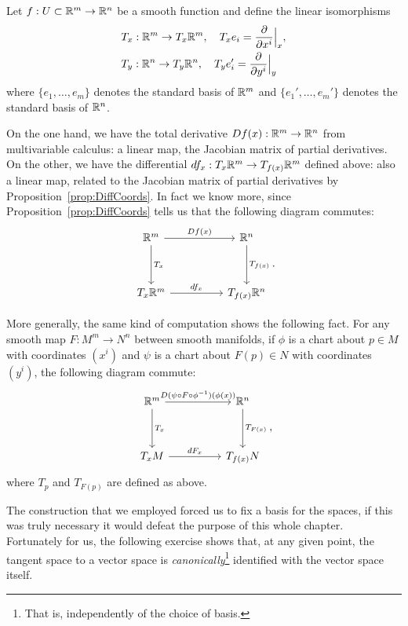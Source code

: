 Let $f:U\subset\mathbb{R}^m\to\mathbb{R}^n$ be a smooth function and define the linear isomorphisms
\begin{align}\label{def:lin_iso_Tp}
    &T_x : \mathbb{R}^m \to T_x\mathbb{R}^m,\quad T_x e_i = \frac{\partial}{\partial x^i}\Big|_x,\\
    &T_y : \mathbb{R}^n \to T_y\mathbb{R}^n,\quad T_y e_i' = \frac{\partial}{\partial y^i}\Big|_y
\end{align}
where $\{e_1,\ldots,e_m\}$ denotes the standard basis of $\mathbb{R}^m$ and $\{e_1',\ldots,e_m'\}$ denotes the standard basis of $\mathbb{R}^n$.

On the one hand, we have the total derivative $Df(x):\mathbb{R}^m\to\mathbb{R}^n$ from multivariable calculus: a linear map, the Jacobian matrix of partial derivatives.
On the other, we have the differential $df_x : T_x \mathbb{R}^m \to T_{f(x)}\mathbb{R}^m$ defined above: also a linear map, related to the Jacobian matrix of partial derivatives by Proposition~\ref{prop:DiffCoords}.
In fact we know more, since Proposition~\ref{prop:DiffCoords} tells us that the following diagram commutes:
\begin{equation}
    \begin{tikzcd}[row sep=huge, column sep=huge]
        \R^m \arrow[r, "Df(x)"] \arrow[d, "T_x"]
        & \R^n \arrow[d, "T_{f(x)}"] \\
        T_x\R^m \arrow[r, "df_x"]
        & T_{f(x)}\R^n
    \end{tikzcd}.
\end{equation}

More generally, the same kind of computation shows the following fact. For any smooth map $F:M^m \to N^n$ between smooth manifolds, if $\phi$ is a chart about $p\in M$ with coordinates $(x^i)$ and $\psi$ is a chart about $F(p)\in N$ with coordinates $(y^i)$, the following diagram commute:
\begin{equation}
    \begin{tikzcd}[row sep=huge, column sep=huge]
        \R^m \arrow[r, "D(\psi \circ F \circ \phi^{-1})(\phi(x))"] \arrow[d, "T_x"]
        & \R^n \arrow[d, "T_{F(x)}"] \\
        T_xM \arrow[r, "dF_x"]
        & T_{f(x)}N
    \end{tikzcd},
\end{equation}
where $T_p$ and $T_{F(p)}$ are defined as above.

The construction that we employed forced us to fix a basis for the spaces, if this was truly necessary it would defeat the purpose of this whole chapter.
Fortunately for us, the following exercise shows that, at any given point, the tangent space to a vector space is \emph{canonically}\footnote{That is, independently of the choice of basis.} identified with the vector space itself.

